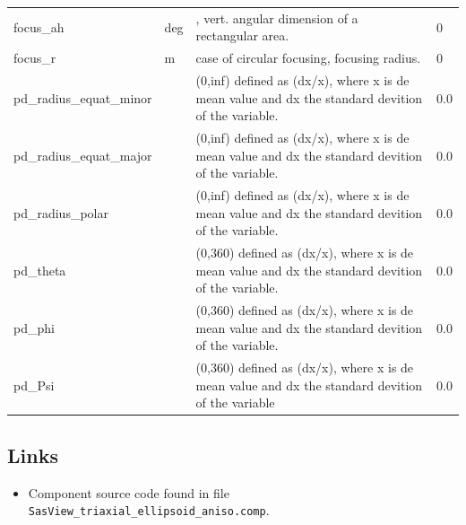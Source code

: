 \begin{longtable}{p{}p{}p{}p{}}
focus\_ah & deg & , vert. angular dimension of a rectangular area. & 0 \\
focus\_r & m & case of circular focusing, focusing radius. & 0 \\
pd\_radius\_equat\_minor &  & (0,inf) defined as (dx/x), where x is de mean value and dx the standard devition of the variable. & 0.0 \\
pd\_radius\_equat\_major &  & (0,inf) defined as (dx/x), where x is de mean value and dx the standard devition of the variable. & 0.0 \\
pd\_radius\_polar &  & (0,inf) defined as (dx/x), where x is de mean value and dx the standard devition of the variable. & 0.0 \\
pd\_theta &  & (0,360) defined as (dx/x), where x is de mean value and dx the standard devition of the variable. & 0.0 \\
pd\_phi &  & (0,360) defined as (dx/x), where x is de mean value and dx the standard devition of the variable. & 0.0 \\
pd\_Psi &  & (0,360) defined as (dx/x), where x is de mean value and dx the standard devition of the variable & 0.0 \\
\bottomrule
\end{longtable}

\subsection*{Links}
\begin{itemize}
  \item Component source code found in file \texttt{SasView\_triaxial\_ellipsoid\_aniso.comp}.
\end{itemize}
